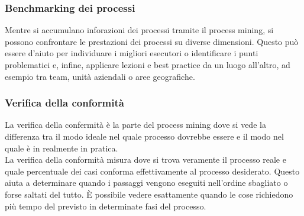 \documentclass{article}
\begin{document}
\subsubsection{Benchmarking dei processi}
Mentre si accumulano inforazioni dei processi tramite il process mining, si possono confrontare le prestazioni dei processi su diverse dimensioni. Questo può essere d'aiuto per individuare i migliori esecutori o identificare i punti problematici e, infine, applicare lezioni e best practice da un luogo all'altro, ad esempio tra team, unità aziendali o aree geografiche.
\subsubsection{Verifica della conformità}
La verifica della confermità è la parte del process mining dove si vede la differenza tra il modo ideale nel quale processo dovrebbe essere e il modo nel quale è in realmente in pratica.\\
La verifica della conformità misura dove si trova veramente il processo reale e quale percentuale dei casi conforma effettivamente al processo desiderato. Questo aiuta a determinare quando i passaggi vengono eseguiti nell'ordine sbagliato o forse saltati del tutto. È possibile vedere esattamente quando le cose richiedono più tempo del previsto in determinate fasi del processo.
\end{document}

